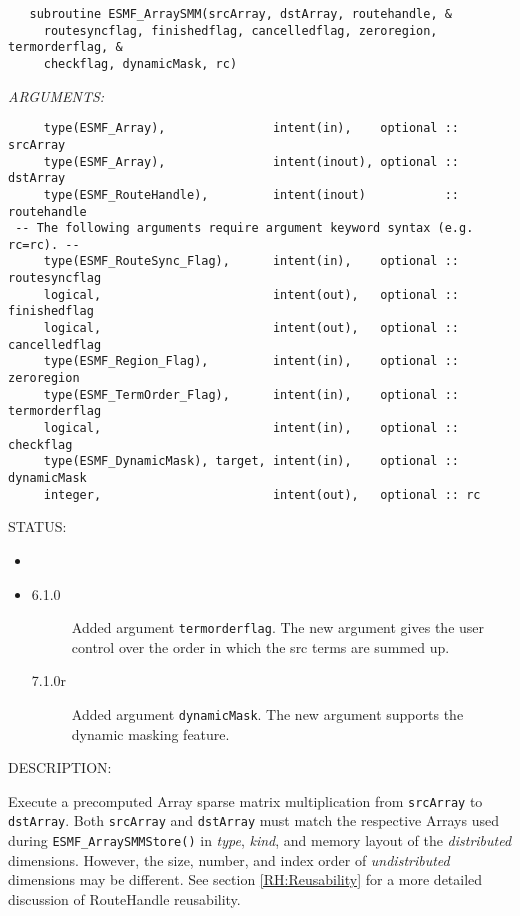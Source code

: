   
\begin{verbatim}   subroutine ESMF_ArraySMM(srcArray, dstArray, routehandle, &
     routesyncflag, finishedflag, cancelledflag, zeroregion, termorderflag, &
     checkflag, dynamicMask, rc)\end{verbatim}{\em ARGUMENTS:}
\begin{verbatim}     type(ESMF_Array),               intent(in),    optional :: srcArray
     type(ESMF_Array),               intent(inout), optional :: dstArray
     type(ESMF_RouteHandle),         intent(inout)           :: routehandle
 -- The following arguments require argument keyword syntax (e.g. rc=rc). --
     type(ESMF_RouteSync_Flag),      intent(in),    optional :: routesyncflag
     logical,                        intent(out),   optional :: finishedflag
     logical,                        intent(out),   optional :: cancelledflag
     type(ESMF_Region_Flag),         intent(in),    optional :: zeroregion
     type(ESMF_TermOrder_Flag),      intent(in),    optional :: termorderflag
     logical,                        intent(in),    optional :: checkflag
     type(ESMF_DynamicMask), target, intent(in),    optional :: dynamicMask
     integer,                        intent(out),   optional :: rc\end{verbatim}
{\sf STATUS:}
   \begin{itemize}
   \item{}
   \item{}
   \begin{description}
   \item[6.1.0] Added argument {\tt termorderflag}.
                The new argument gives the user control over the order in which
                the src terms are summed up.
   \item[7.1.0r] Added argument {\tt dynamicMask}.
                The new argument supports the dynamic masking feature.
   \end{description}
   \end{itemize}
  
{\sf DESCRIPTION:\\ }


     \begin{sloppypar}
     Execute a precomputed Array sparse matrix multiplication from {\tt srcArray}
     to {\tt dstArray}.
     Both {\tt srcArray} and {\tt dstArray} must match the respective Arrays
     used during {\tt ESMF\_ArraySMMStore()} in {\em type}, {\em kind}, and 
     memory layout of the {\em distributed} dimensions. However, the size, 
     number, and index order of {\em undistributed} dimensions may be different. See section
     \ref{RH:Reusability} for a more detailed discussion of RouteHandle 
     reusability.
     \end{sloppypar}
  
